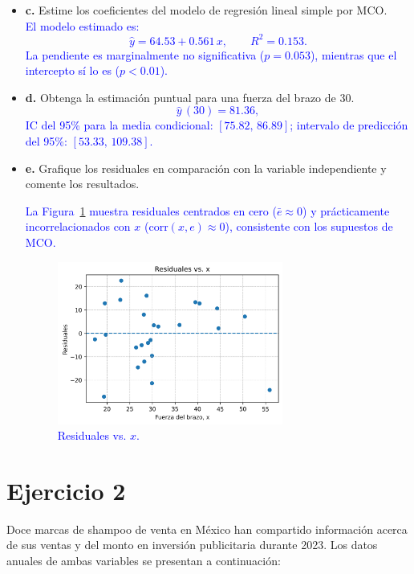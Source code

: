\documentclass[10pt]{article}
\begin{document}
\begin{itemize}
		\item \textbf{c.} Estime los coeficientes del modelo de regresión lineal simple por MCO.\\
		\textcolor{blue}{
			El modelo estimado es: \[
			\hat{y}=64.53+0.561\,x, \qquad R^2=0.153.
			\]
			La pendiente es marginalmente no significativa ($p=0.053$), mientras que el intercepto sí lo es ($p<0.01$).
		}


		\item \textbf{d.} Obtenga la estimación puntual para una fuerza del brazo de 30.\\
		\textcolor{blue}{		
			\[
				\hat{y}\,(30)=81.36,
			\]
			IC del 95\% para la media condicional: $[75.82,\,86.89]$; intervalo de predicción del 95\%: $[53.33,\,109.38]$.	
		}

		\item \textbf{e.} Grafique los residuales en comparación con la variable independiente y comente los resultados.\\
		\textcolor{blue}{
			La Figura~\ref{fig:resid} muestra residuales centrados en cero ($\bar e\approx0$) y prácticamente incorrelacionados con $x$ (\(\mathrm{corr}(x,e)\approx0\)), consistente con los supuestos de MCO.
			\begin{figure}[H]
				\centering
				\includegraphics[width=0.7\textwidth]{../plots/python/ejercicio1/residuals_plot.png}
				\caption{Residuales vs. $x$.}
				\label{fig:resid}
			\end{figure} 
		}
	\end{itemize}

\section{Ejercicio 2}
Doce marcas de shampoo de venta en México han compartido información
acerca de sus ventas y del monto en inversión publicitaria durante 2023. Los
datos anuales de ambas variables se presentan a continuación:
\end{document}
